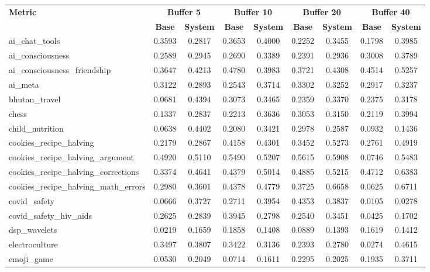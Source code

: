\documentclass[pdflatex,sn-mathphys-num]{sn-jnl}%
\theoremstyle{thmstyleone}%
\theoremstyle{thmstyletwo}%
\theoremstyle{thmstylethree}%
\begin{document}
\begin{appendices}
\begin{landscape}
\begin{longtable}{@{}p{3.8cm}cccccccc@{}}
\toprule
\textbf{Metric} & \multicolumn{2}{c}{\textbf{Buffer 5}} & \multicolumn{2}{c}{\textbf{Buffer 10}} & \multicolumn{2}{c}{\textbf{Buffer 20}} & \multicolumn{2}{c}{\textbf{Buffer 40}} \\
\cmidrule(lr){2-3}\cmidrule(lr){4-5}\cmidrule(lr){6-7}\cmidrule(lr){8-9}
 & \textbf{Base} & \textbf{System} & \textbf{Base} & \textbf{System} & \textbf{Base} & \textbf{System} & \textbf{Base} & \textbf{System} \\
\midrule
\endhead
ai\_chat\_tools & 0.3593 & 0.2817 & 0.3653 & 0.4000 & 0.2252 & 0.3455 & 0.1798 & 0.3985 \\
ai\_consciousness & 0.2589 & 0.2945 & 0.2690 & 0.3389 & 0.2391 & 0.2936 & 0.3008 & 0.3789 \\
ai\_consciousness\_friendship & 0.3647 & 0.4213 & 0.4780 & 0.3983 & 0.3721 & 0.4308 & 0.4514 & 0.5257 \\
ai\_meta & 0.3122 & 0.2893 & 0.2543 & 0.3714 & 0.3302 & 0.3252 & 0.2917 & 0.3237 \\
bhutan\_travel & 0.0681 & 0.4394 & 0.3073 & 0.3465 & 0.2359 & 0.3370 & 0.2375 & 0.3178 \\
chess & 0.1337 & 0.2837 & 0.2213 & 0.3636 & 0.3053 & 0.3150 & 0.2119 & 0.3994 \\
child\_nutrition & 0.0638 & 0.4402 & 0.2080 & 0.3421 & 0.2978 & 0.2587 & 0.0932 & 0.1436 \\
cookies\_recipe\_halving & 0.2179 & 0.2867 & 0.4158 & 0.4301 & 0.3452 & 0.5273 & 0.2761 & 0.4919 \\
cookies\_recipe\_halving\_argument & 0.4920 & 0.5110 & 0.5490 & 0.5207 & 0.5615 & 0.5908 & 0.0746 & 0.5483 \\
cookies\_recipe\_halving\_corrections & 0.3374 & 0.4641 & 0.4379 & 0.5014 & 0.4885 & 0.5215 & 0.4712 & 0.6383 \\
cookies\_recipe\_halving\_math\_errors & 0.2980 & 0.3601 & 0.4378 & 0.4779 & 0.3725 & 0.6658 & 0.0625 & 0.6711 \\
covid\_safety & 0.0666 & 0.3727 & 0.2711 & 0.3954 & 0.4353 & 0.3837 & 0.0105 & 0.0278 \\
covid\_safety\_hiv\_aids & 0.2625 & 0.2839 & 0.3945 & 0.2798 & 0.2540 & 0.3451 & 0.0425 & 0.1702 \\
dsp\_wavelets & 0.0219 & 0.1659 & 0.1858 & 0.1408 & 0.0889 & 0.1393 & 0.1619 & 0.1412 \\
electroculture & 0.3497 & 0.3807 & 0.3422 & 0.3136 & 0.2393 & 0.2780 & 0.0274 & 0.4615 \\
emoji\_game & 0.0530 & 0.2049 & 0.0714 & 0.1611 & 0.2295 & 0.2025 & 0.1935 & 0.3711 \\

\end{longtable}
\end{landscape}
\end{appendices}
\end{document}
